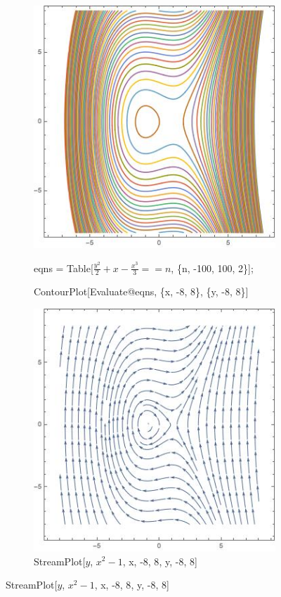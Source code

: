 \documentclass[12pt,letterpaper,reqno]{amsart}
\begin{document}
\begin{enumerate}
\begin{flushleft}
\begin{enumerate}
    \begin{figure}[h]
    \centering
    \begin{subfigure}{.5\textwidth}
      \centering
      \includegraphics[width=.8\linewidth]{./ContourPlotA.jpeg}
      \caption*{eqns = Table[$\frac{y^2}{2} + x - \frac{x^3}{3} == n$, \{n, -100, 100, 2\}];}
      \caption*{ContourPlot[Evaluate@eqns, \{x, -8, 8\}, \{y, -8, 8\}]}
    \end{subfigure}%
    \begin{subfigure}{.5\textwidth}
      \centering
      \includegraphics[width=.8\linewidth]{./StreamPlotA.jpeg}
      \caption*{StreamPlot[{$y$, $x^2 - 1$}, {x, -8, 8}, {y, -8, 8}]}
    \end{subfigure}
    \end{figure}
    

\end{enumerate}
\end{flushleft}
\end{enumerate}
\end{document}
